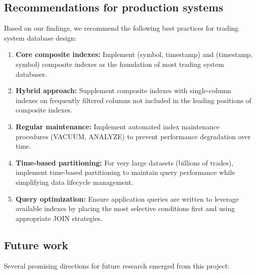 \documentclass[11pt,a4paper]{article}
\begin{document}
\subsection{Recommendations for production systems}

Based on our findings, we recommend the following best practices for trading system database design:

\begin{enumerate}
    \item \textbf{Core composite indexes:} Implement (symbol, timestamp) and (timestamp, symbol) composite indexes as the foundation of most trading system databases.
    
    \item \textbf{Hybrid approach:} Supplement composite indexes with single-column indexes on frequently filtered columns not included in the leading positions of composite indexes.
    
    \item \textbf{Regular maintenance:} Implement automated index maintenance procedures (VACUUM, ANALYZE) to prevent performance degradation over time.
    
    \item \textbf{Time-based partitioning:} For very large datasets (billions of trades), implement time-based partitioning to maintain query performance while simplifying data lifecycle management.
    
    \item \textbf{Query optimization:} Ensure application queries are written to leverage available indexes by placing the most selective conditions first and using appropriate JOIN strategies.
\end{enumerate}

\subsection{Future work}

Several promising directions for future research emerged from this project:
\end{document}
